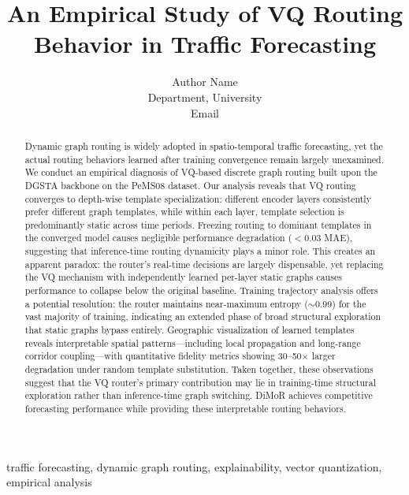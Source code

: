 \documentclass[journal]{IEEEtran}
\begin{document}
\title{An Empirical Study of VQ Routing Behavior in Traffic Forecasting}

\author{Author Name\\Department, University\\Email}

\maketitle

\begin{abstract}
Dynamic graph routing is widely adopted in spatio-temporal traffic forecasting, yet the actual routing behaviors learned after training convergence remain largely unexamined. We conduct an empirical diagnosis of VQ-based discrete graph routing built upon the DGSTA backbone on the PeMS08 dataset. Our analysis reveals that VQ routing converges to depth-wise template specialization: different encoder layers consistently prefer different graph templates, while within each layer, template selection is predominantly static across time periods. Freezing routing to dominant templates in the converged model causes negligible performance degradation ($<$0.03 MAE), suggesting that inference-time routing dynamicity plays a minor role. This creates an apparent paradox: the router's real-time decisions are largely dispensable, yet replacing the VQ mechanism with independently learned per-layer static graphs causes performance to collapse below the original baseline. Training trajectory analysis offers a potential resolution: the router maintains near-maximum entropy ($\sim$0.99) for the vast majority of training, indicating an extended phase of broad structural exploration that static graphs bypass entirely. Geographic visualization of learned templates reveals interpretable spatial patterns---including local propagation and long-range corridor coupling---with quantitative fidelity metrics showing 30--50$\times$ larger degradation under random template substitution. Taken together, these observations suggest that the VQ router's primary contribution may lie in training-time structural exploration rather than inference-time graph switching. DiMoR achieves competitive forecasting performance while providing these interpretable routing behaviors.
\end{abstract}

\begin{IEEEkeywords}
traffic forecasting, dynamic graph routing, explainability, vector quantization, empirical analysis
\end{IEEEkeywords}
\end{document}
